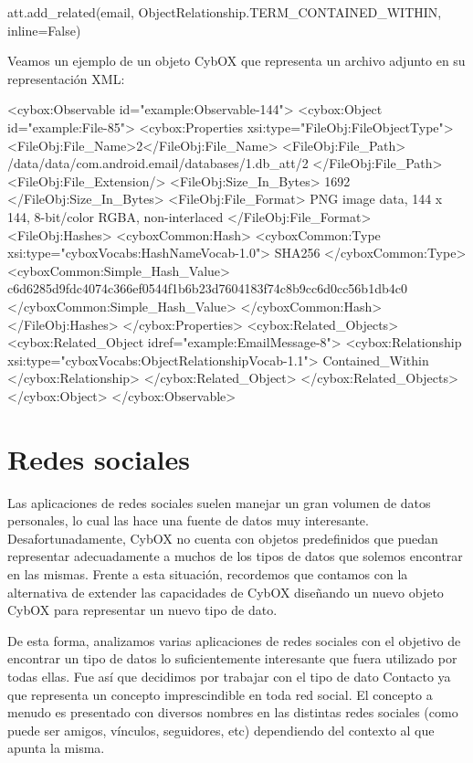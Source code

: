 \begin{python}
att.add_related(email,
             ObjectRelationship.TERM_CONTAINED_WITHIN, 
             inline=False)
\end{python}

Veamos un ejemplo de un objeto CybOX que representa un archivo adjunto en su representación XML:
\newline

\begin{xml}
<cybox:Observable id="example:Observable-144">
  <cybox:Object id="example:File-85">
    <cybox:Properties xsi:type="FileObj:FileObjectType">
      <FileObj:File_Name>2</FileObj:File_Name>
      <FileObj:File_Path>
/data/data/com.android.email/databases/1.db_att/2
      </FileObj:File_Path>
      <FileObj:File_Extension/>
      <FileObj:Size_In_Bytes>
        1692
      </FileObj:Size_In_Bytes>
      <FileObj:File_Format>
        PNG image data, 144 x 144, 
        8-bit/color RGBA, non-interlaced
      </FileObj:File_Format>
      <FileObj:Hashes>
        <cyboxCommon:Hash>
          <cyboxCommon:Type xsi:type="cyboxVocabs:HashNameVocab-1.0">
            SHA256
          </cyboxCommon:Type>
          <cyboxCommon:Simple_Hash_Value>
c6d6285d9fdc4074c366ef0544f1b6b23d7604183f74c8b9cc6d0cc56b1db4c0
          </cyboxCommon:Simple_Hash_Value>
        </cyboxCommon:Hash>
      </FileObj:Hashes>
    </cybox:Properties>
    <cybox:Related_Objects>
      <cybox:Related_Object idref="example:EmailMessage-8">
        <cybox:Relationship xsi:type="cyboxVocabs:ObjectRelationshipVocab-1.1">
          Contained_Within
        </cybox:Relationship>
      </cybox:Related_Object>
    </cybox:Related_Objects>
  </cybox:Object>
</cybox:Observable>
\end{xml}

\section{Redes sociales}
Las aplicaciones de redes sociales suelen manejar un gran volumen de datos personales, lo cual las hace una fuente de datos muy interesante. Desafortunadamente, CybOX no cuenta con objetos predefinidos que puedan representar adecuadamente a muchos de los tipos de datos que solemos encontrar en las mismas. Frente a esta situación, recordemos que contamos con la alternativa de extender las capacidades de CybOX diseñando un nuevo objeto CybOX para representar un nuevo tipo de dato.

De esta forma, analizamos varias aplicaciones de redes sociales con el objetivo de encontrar un tipo de datos lo suficientemente interesante que fuera utilizado por todas ellas. Fue así que decidimos por trabajar con el tipo de dato Contacto ya que representa un concepto imprescindible en toda red social. El concepto a menudo es presentado con diversos nombres en las distintas redes sociales (como puede ser amigos, vínculos, seguidores, etc) dependiendo del contexto al que apunta la misma.

